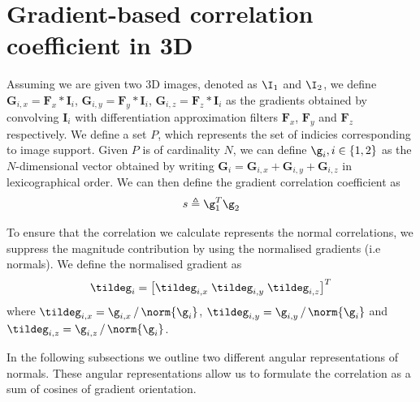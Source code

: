 \section{Gradient-based correlation coefficient in 3D}\label{sec:uniform-proof}
Assuming we are given two 3D images, denoted as $\I_1$ and $\I_2$, we define $\boldsymbol{G}_{i,x} = \boldsymbol{F}_x \ast \boldsymbol{I}_i$, $\boldsymbol{G}_{i,y} = \boldsymbol{F}_y \ast \boldsymbol{I}_i$, $\boldsymbol{G}_{i,z} = \boldsymbol{F}_z \ast \boldsymbol{I}_i$ as the gradients obtained by convolving $\boldsymbol{I}_i$ with differentiation approximation filters $\boldsymbol{F}_x$, $\boldsymbol{F}_y$ and $\boldsymbol{F}_z$ respectively.  We define a set $P$, which represents the set of indicies corresponding to image support. Given $P$ is of cardinality $N$, we can define $\g_i, i \in \{1,2\}$ as the $N$-dimensional vector obtained by writing $\boldsymbol{G}_i = \boldsymbol{G}_{i,x} + \boldsymbol{G}_{i,y} + \boldsymbol{G}_{i,z}$ in lexicographical order. We can then define the gradient correlation coefficient as
\begin{equation}\label{eq:grad-corr}
    s \triangleq \g_1^T \g_2
\end{equation}

To ensure that the correlation we calculate represents the normal correlations, we suppress the magnitude contribution by using the normalised gradients (i.e normals). We define the normalised gradient as
\begin{equation}\label{eq:tilde-g}
    \tildeg_i = \left[ \tildeg_{i,x} \; \tildeg_{i,y} \; \tildeg_{i,z} \right]^T
\end{equation}
where $\tildeg_{i,x} = \g_{i,x} \, / \, \norm{\g_i}$, $\tildeg_{i,y} = \g_{i,y} \, / \, \norm{\g_i}$ and $\tildeg_{i,z} = \g_{i,z} \, / \, \norm{\g_i}$.

In the following subsections we outline two different angular representations of normals. These angular representations allow us to formulate the correlation as a sum of cosines of gradient orientation.

